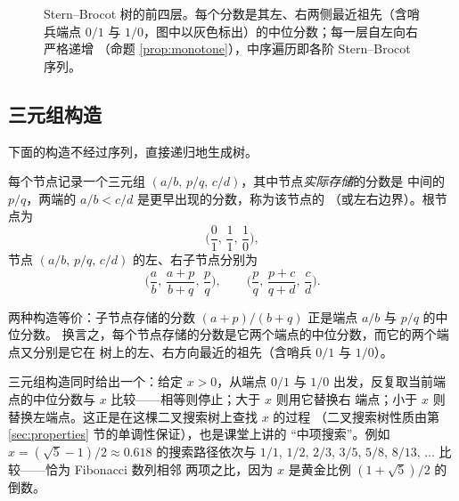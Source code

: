 \begin{figure}[htbp]
\centering
{}
\caption{Stern--Brocot 树的前四层。每个分数是其左、右两侧最近祖先（含哨兵端点
$0/1$ 与 $1/0$，图中以灰色标出）的中位分数；每一层自左向右严格递增
（命题 \ref{prop:monotone}），中序遍历即各阶 Stern--Brocot 序列。}
\label{fig:sb-tree}
\end{figure}

\subsection{三元组构造}

下面的构造不经过序列，直接递归地生成树。

\begin{definition}[三元组构造]\label{def:triple}
每个节点记录一个三元组 $(a/b,\,p/q,\,c/d)$，其中节点\emph{实际存储}的分数是
中间的 $p/q$，两端的 $a/b<c/d$ 是更早出现的分数，称为该节点的
（或左右边界）。根节点为
\[
  \Big(\frac01,\,\frac11,\,\frac10\Big),
\]
节点 $(a/b,\,p/q,\,c/d)$ 的左、右子节点分别为
\[
  \Big(\frac ab,\,\frac{a+p}{b+q},\,\frac pq\Big),
  \qquad
  \Big(\frac pq,\,\frac{p+c}{q+d},\,\frac cd\Big).
\]
\end{definition}

两种构造等价：子节点存储的分数 $(a+p)/(b+q)$ 正是端点 $a/b$ 与 $p/q$ 的中位分数。
换言之，每个节点存储的分数是它两个端点的中位分数，而它的两个端点又分别是它在
树上的左、右方向最近的祖先（含哨兵 $0/1$ 与 $1/0$）。

\begin{remark}\label{rem:search-proc}
三元组构造同时给出一个：给定 $x>0$，从端点 $0/1$ 与 $1/0$
出发，反复取当前端点的中位分数与 $x$ 比较——相等则停止；大于 $x$ 则用它替换右
端点；小于 $x$ 则替换左端点。这正是在这棵二叉搜索树上查找 $x$ 的过程
（二叉搜索树性质由第 \ref{sec:properties} 节的单调性保证），也是课堂上讲的
``中项搜索''。例如 $x=(\sqrt5-1)/2\approx0.618$ 的搜索路径依次与
$1/1,\,1/2,\,2/3,\,3/5,\,5/8,\,8/13,\,\ldots$ 比较——恰为 Fibonacci 数列相邻
两项之比，因为 $x$ 是黄金比例 $(1+\sqrt5)/2$ 的倒数。
\end{remark}
